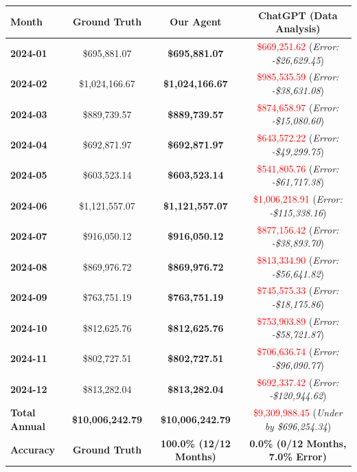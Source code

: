 \documentclass[11pt,a4paper]{article}
\begin{document}
{\footnotesize
\begin{center}
\begin{tabular}{@{}lccc@{}}
\toprule
Month & \textbf{Ground Truth} & \textbf{Our Agent} & \textbf{ChatGPT (Data Analysis)} \\
\midrule
\textbf{2024-01} & \$695,881.07 & \textbf{\$695,881.07} & \textcolor{red}{\$669,251.62} (\emph{Error: -\$26,629.45}) \\
\textbf{2024-02} & \$1,024,166.67 & \textbf{\$1,024,166.67} & \textcolor{red}{\$985,535.59} (\emph{Error: -\$38,631.08}) \\
\textbf{2024-03} & \$889,739.57 & \textbf{\$889,739.57} & \textcolor{red}{\$874,658.97} (\emph{Error: -\$15,080.60}) \\
\textbf{2024-04} & \$692,871.97 & \textbf{\$692,871.97} & \textcolor{red}{\$643,572.22} (\emph{Error: -\$49,299.75}) \\
\textbf{2024-05} & \$603,523.14 & \textbf{\$603,523.14} & \textcolor{red}{\$541,805.76} (\emph{Error: -\$61,717.38}) \\
\textbf{2024-06} & \$1,121,557.07 & \textbf{\$1,121,557.07} & \textcolor{red}{\$1,006,218.91} (\emph{Error: -\$115,338.16}) \\
\textbf{2024-07} & \$916,050.12 & \textbf{\$916,050.12} & \textcolor{red}{\$877,156.42} (\emph{Error: -\$38,893.70}) \\
\textbf{2024-08} & \$869,976.72 & \textbf{\$869,976.72} & \textcolor{red}{\$813,334.90} (\emph{Error: -\$56,641.82}) \\
\textbf{2024-09} & \$763,751.19 & \textbf{\$763,751.19} & \textcolor{red}{\$745,575.33} (\emph{Error: -\$18,175.86}) \\
\textbf{2024-10} & \$812,625.76 & \textbf{\$812,625.76} & \textcolor{red}{\$753,903.89} (\emph{Error: -\$58,721.87}) \\
\textbf{2024-11} & \$802,727.51 & \textbf{\$802,727.51} & \textcolor{red}{\$706,636.74} (\emph{Error: -\$96,090.77}) \\
\textbf{2024-12} & \$813,282.04 & \textbf{\$813,282.04} & \textcolor{red}{\$692,337.42} (\emph{Error: -\$120,944.62}) \\
\midrule
\textbf{Total Annual} & \textbf{\$10,006,242.79} & \textbf{\$10,006,242.79} & \textcolor{red}{\$9,309,988.45} (\emph{Under by \$696,254.34}) \\
\textbf{Accuracy} & \textbf{Ground Truth} & \textbf{100.0\% (12/12 Months)} & \textbf{0.0\% (0/12 Months, 7.0\% Error)} \\
\bottomrule
\end{tabular}
\end{center}
}
\end{document}
